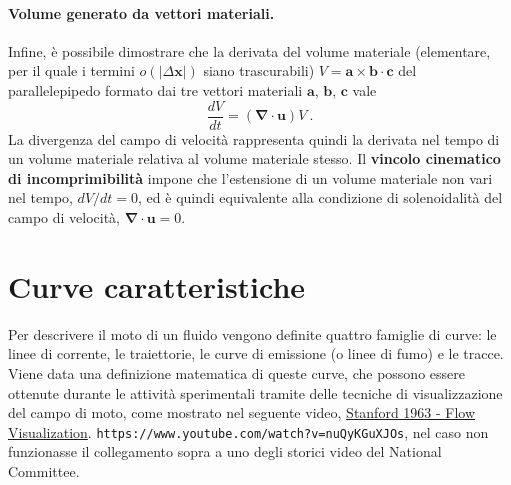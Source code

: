 \paragraph{Volume generato da vettori materiali.}
Infine, è possibile dimostrare che la derivata del volume materiale (elementare, per il quale i termini $o(|\Delta \bm{x}|)$ siano trascurabili) $V = \bm{a} \times \bm{b} \cdot \bm{c}$ del parallelepipedo formato dai tre vettori materiali $\bm{a}$, $\bm{b}$, $\bm{c}$ vale 
\begin{equation}
 \dfrac{d V}{d t} = (\bm{\nabla} \cdot \bm{u}) V \ .
\end{equation}
La divergenza del campo di velocità rappresenta quindi la derivata nel tempo di un volume materiale relativa al volume materiale stesso. Il \textbf{vincolo cinematico di incomprimibilità} impone che l'estensione di un volume materiale non vari nel tempo, $dV/dt = 0$, ed è quindi equivalente alla condizione di solenoidalità del campo di velocità, $\bm{\nabla} \cdot \bm{u} = 0$.


\section{Curve caratteristiche}
Per descrivere il moto di un fluido vengono definite quattro famiglie di curve: le linee di corrente, le traiettorie, le curve di emissione (o linee di fumo) e le tracce. Viene data una definizione matematica di queste curve, che possono essere ottenute durante le attività sperimentali tramite delle tecniche di visualizzazione del campo di moto, come mostrato nel seguente video,
%
\noindent
\vspace{0.3cm}
\href{https://www.youtube.com/watch?v=nuQyKGuXJOs}{Stanford 1963 - Flow Visualization}. \newline
\texttt{https://www.youtube.com/watch?v=nuQyKGuXJOs}, nel caso non funzionasse il collegamento sopra a uno degli storici video del National Committee.
%
\vspace{0.3cm}

